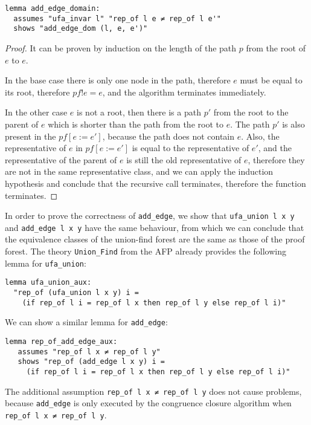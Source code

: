 \begin{lstlisting}
lemma add_edge_domain:
  assumes "ufa_invar l" "rep_of l e ≠ rep_of l e'"
  shows "add_edge_dom (l, e, e')"
\end{lstlisting}

\begin{proof}
It can be proven by induction on the length of the path $p$ from the root of $e$ to $e$.

In the base case there is only one node in the path, therefore $e$ must be equal to its root, therefore $pf ! e = e$, and the algorithm terminates immediately.

In the other case $e$ is not a root, then there is a path $p'$ from the root to the parent of $e$ which is shorter than the path from the root to $e$. The path $p'$ is also present in the $pf[e := e']$, because the path does not contain $e$. Also, the representative of $e$ in $pf[e := e']$ is equal to the representative of $e'$, and the representative of the parent of $e$ is still the old representative of $e$, therefore they are not in the same representative class, and we can apply the induction hypothesis and conclude that the recursive call terminates, therefore the function terminates.
\end{proof}

In order to prove the correctness of \lstinline|add_edge|, we show that \lstinline{ufa_union l x y} and \lstinline{add_edge l x y} have the same behaviour, from which we can conclude that the equivalence classes of the union-find forest are the same as those of the proof forest. The theory \lstinline{Union_Find} from the AFP\cite{Sep} already provides the following lemma for \lstinline{ufa_union}:

\begin{lstlisting}
lemma ufa_union_aux:
  "rep_of (ufa_union l x y) i =
    (if rep_of l i = rep_of l x then rep_of l y else rep_of l i)"
\end{lstlisting}

We can show a similar lemma for \lstinline{add_edge}:

\begin{lstlisting}
lemma rep_of_add_edge_aux:
   assumes "rep_of l x ≠ rep_of l y"
   shows "rep_of (add_edge l x y) i =
     (if rep_of l i = rep_of l x then rep_of l y else rep_of l i)"
\end{lstlisting}

The additional assumption \lstinline{rep_of l x ≠ rep_of l y} does not cause problems, because \lstinline{add_edge} is only executed by the congruence closure algorithm when \lstinline{rep_of l x ≠ rep_of l y}.

